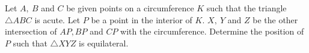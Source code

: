 Let $A,\ B$ and $C$ be given points on a circumference $K$ such that the triangle $\triangle{ABC}$ is acute. Let $P$ be a point in the interior of $K$. $X,\ Y$ and $Z$ be the other intersection of $AP, BP$ and $CP$  with the circumference. Determine the position of $P$ such that $\triangle{XYZ}$ is equilateral.
